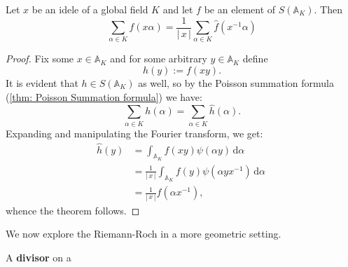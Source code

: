 \documentclass[11pt, x11names]{book}
\renewcommand{\aa}{\mathbb{A}}
\newcommand{\abs}[1]{\left| \, #1  \,\right|}
\renewcommand{\hat}{\widehat}
\newcommand{\inv}[1]{#1^{-1}}
\renewcommand{\d}[1]{\, \mathrm{d}#1 \ }
\begin{document}
\begin{theorem}
\label{thm: Riemann-Roch}
Let $x$ be an idele of a global field $K$ and let $f$ be an element of $S(\aa_K)$. Then
\begin{equation*}
    \sum_{ \alpha \in K}f(x\alpha ) = \frac{1}{\abs{x}}\sum_{\alpha  \in K} \hat{f}(\inv{x}\alpha)
\end{equation*}
\end{theorem}
\begin{proof}
Fix some $x \in \aa_K$ and for some arbitrary $y \in \aa_K$ define
\begin{equation*}
    h(y) := f(xy).
\end{equation*}
It is evident that $h \in S(\aa_K)$ as well, so by the Poisson summation formula (\ref{thm: Poisson Summation formula}) we have:
\begin{equation*}
    \sum_{\alpha \in K} h(\alpha) = \sum_{\alpha \in K} \hat{h}(\alpha).
\end{equation*}
Expanding and manipulating the Fourier transform, we get:
\begin{align*}
    \hat{h}(y) &= \int_{\aa_K} f(xy) \psi(\alpha y) \d{\alpha}\\
    &= \frac{1}{\abs{x}} \int_{\aa_K} f(y) \psi(\alpha y \inv{x}) \d{\alpha}\\
    &= \frac{1}{\abs{x}} \hat{f}(\alpha \inv{x}),
\end{align*}
whence the theorem follows.
\end{proof}

We now explore the Riemann-Roch in a more geometric setting.
\begin{defn}
    A \textbf{divisor} on a 
\end{defn}
\end{document}
